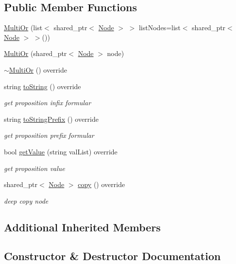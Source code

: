 \subsection*{Public Member Functions}
\begin{DoxyCompactItemize}
\item 
\hyperlink{class_multi_or_a55dd7025f9f40187496f481f252e33dc}{Multi\+Or} (list$<$ shared\+\_\+ptr$<$ \hyperlink{class_node}{Node} $>$ $>$ list\+Nodes=list$<$ shared\+\_\+ptr$<$ \hyperlink{class_node}{Node} $>$ $>$())
\item 
\hyperlink{class_multi_or_a17ce7a33d4fe548dca2db45a59202057}{Multi\+Or} (shared\+\_\+ptr$<$ \hyperlink{class_node}{Node} $>$ node)
\item 
\hyperlink{class_multi_or_a4f0161febe9e9fe9d4fc44708369de51}{$\sim$\+Multi\+Or} () override
\item 
string \hyperlink{class_multi_or_ade4d5f7db13aca1020dba2396ef00dd7}{to\+String} () override
\begin{DoxyCompactList}\small\item\em get proposition infix formular \end{DoxyCompactList}\item 
string \hyperlink{class_multi_or_a80405614a8a8db0992c35a70f36aa025}{to\+String\+Prefix} () override
\begin{DoxyCompactList}\small\item\em get proposition prefix formular \end{DoxyCompactList}\item 
bool \hyperlink{class_multi_or_a7146240d304444ee0da5c949c584971e}{get\+Value} (string val\+List) override
\begin{DoxyCompactList}\small\item\em get proposition value \end{DoxyCompactList}\item 
shared\+\_\+ptr$<$ \hyperlink{class_node}{Node} $>$ \hyperlink{class_multi_or_a9a81647d40f86c825fdb1513f1b3f30c}{copy} () override
\begin{DoxyCompactList}\small\item\em deep copy node \end{DoxyCompactList}\end{DoxyCompactItemize}
\subsection*{Additional Inherited Members}


\subsection{Constructor \& Destructor Documentation}
\mbox{\label{class_multi_or_a55dd7025f9f40187496f481f252e33dc}} 
